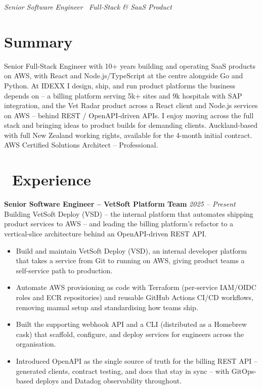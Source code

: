 \documentclass{resume}
\begin{document}

\name{\textcolor{accent}{Jonathan Xu}}
\vspace{-0.3ex}
\centerline{\large\itshape\textcolor{accent}{Senior Software Engineer \textperiodcentered\ Full-Stack \& SaaS Product}}
\vspace{0.9ex}

  \vspace{2em}

\section*{Summary}
Senior Full-Stack Engineer with 10+ years building and operating SaaS products on AWS, with React and Node.js/TypeScript at the centre alongside Go and Python. At IDEXX I design, ship, and run product platforms the business depends on -- a billing platform serving 5k+ sites and 9k hospitals with SAP integration, and the Vet Radar product across a React client and Node.js services on AWS -- behind REST / OpenAPI-driven APIs. I enjoy moving across the full stack and bringing ideas to product builds for demanding clients. Auckland-based with full New Zealand working rights, available for the 4-month initial contract. AWS Certified Solutions Architect -- Professional.

\section{\faUsers\ Experience}
\vspace{1em}
\textbf{Senior Software Engineer -- VetSoft Platform Team} \hfill \textit{2025 -- Present} \\
Building VetSoft Deploy (VSD) -- the internal platform that automates shipping product services to AWS -- and leading the billing platform's refactor to a vertical-slice architecture behind an OpenAPI-driven REST API.
\begin{itemize}
  \item Build and maintain VetSoft Deploy (VSD), an internal developer platform that takes a service from Git to running on AWS, giving product teams a self-service path to production.
  \item Automate AWS provisioning as code with Terraform (per-service IAM/OIDC roles and ECR repositories) and reusable GitHub Actions CI/CD workflows, removing manual setup and standardising how teams ship.
  \item Built the supporting webhook API and a CLI (distributed as a Homebrew cask) that scaffold, configure, and deploy services for engineers across the organisation.
  \item Introduced OpenAPI as the single source of truth for the billing REST API -- generated clients, contract testing, and docs that stay in sync -- with GitOps-based deploys and Datadog observability throughout.
\end{itemize}
\end{document}
